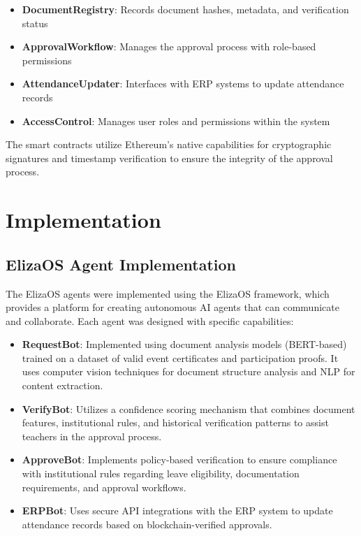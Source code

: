 \documentclass[a4paper,12pt]{article}
\begin{document}
\begin{itemize}
    \item \textbf{DocumentRegistry}: Records document hashes, metadata, and verification status
    \item \textbf{ApprovalWorkflow}: Manages the approval process with role-based permissions
    \item \textbf{AttendanceUpdater}: Interfaces with ERP systems to update attendance records
    \item \textbf{AccessControl}: Manages user roles and permissions within the system
\end{itemize}

The smart contracts utilize Ethereum's native capabilities for cryptographic signatures and timestamp verification to ensure the integrity of the approval process.

\section{Implementation}
\subsection{ElizaOS Agent Implementation}
The ElizaOS agents were implemented using the ElizaOS framework, which provides a platform for creating autonomous AI agents that can communicate and collaborate. Each agent was designed with specific capabilities:

\begin{itemize}
    \item \textbf{RequestBot}: Implemented using document analysis models (BERT-based) trained on a dataset of valid event certificates and participation proofs. It uses computer vision techniques for document structure analysis and NLP for content extraction.
    
    \item \textbf{VerifyBot}: Utilizes a confidence scoring mechanism that combines document features, institutional rules, and historical verification patterns to assist teachers in the approval process.
    
    \item \textbf{ApproveBot}: Implements policy-based verification to ensure compliance with institutional rules regarding leave eligibility, documentation requirements, and approval workflows.
    
    \item \textbf{ERPBot}: Uses secure API integrations with the ERP system to update attendance records based on blockchain-verified approvals.
\end{itemize}
\end{document}
